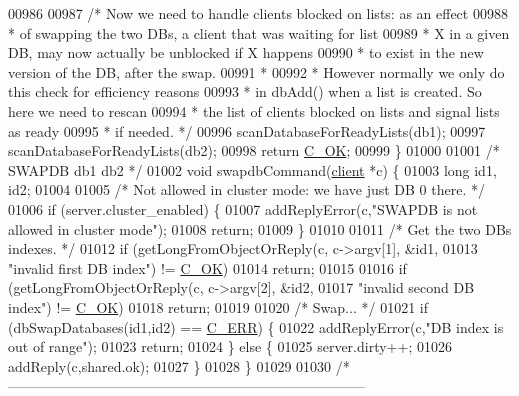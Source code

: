 \begin{DoxyCode}
00986 
00987     \textcolor{comment}{/* Now we need to handle clients blocked on lists: as an effect}
00988 \textcolor{comment}{     * of swapping the two DBs, a client that was waiting for list}
00989 \textcolor{comment}{     * X in a given DB, may now actually be unblocked if X happens}
00990 \textcolor{comment}{     * to exist in the new version of the DB, after the swap.}
00991 \textcolor{comment}{     *}
00992 \textcolor{comment}{     * However normally we only do this check for efficiency reasons}
00993 \textcolor{comment}{     * in dbAdd() when a list is created. So here we need to rescan}
00994 \textcolor{comment}{     * the list of clients blocked on lists and signal lists as ready}
00995 \textcolor{comment}{     * if needed. */}
00996     scanDatabaseForReadyLists(db1);
00997     scanDatabaseForReadyLists(db2);
00998     \textcolor{keywordflow}{return} \hyperlink{server_8h_a303769ef1065076e68731584e758d3e1}{C\_OK};
00999 \}
01000 
01001 \textcolor{comment}{/* SWAPDB db1 db2 */}
01002 \textcolor{keywordtype}{void} swapdbCommand(\hyperlink{structclient}{client} *c) \{
01003     \textcolor{keywordtype}{long} id1, id2;
01004 
01005     \textcolor{comment}{/* Not allowed in cluster mode: we have just DB 0 there. */}
01006     \textcolor{keywordflow}{if} (server.cluster\_enabled) \{
01007         addReplyError(c,\textcolor{stringliteral}{"SWAPDB is not allowed in cluster mode"});
01008         \textcolor{keywordflow}{return};
01009     \}
01010 
01011     \textcolor{comment}{/* Get the two DBs indexes. */}
01012     \textcolor{keywordflow}{if} (getLongFromObjectOrReply(c, c->argv[1], &id1,
01013         \textcolor{stringliteral}{"invalid first DB index"}) != \hyperlink{server_8h_a303769ef1065076e68731584e758d3e1}{C\_OK})
01014         \textcolor{keywordflow}{return};
01015 
01016     \textcolor{keywordflow}{if} (getLongFromObjectOrReply(c, c->argv[2], &id2,
01017         \textcolor{stringliteral}{"invalid second DB index"}) != \hyperlink{server_8h_a303769ef1065076e68731584e758d3e1}{C\_OK})
01018         \textcolor{keywordflow}{return};
01019 
01020     \textcolor{comment}{/* Swap... */}
01021     \textcolor{keywordflow}{if} (dbSwapDatabases(id1,id2) == \hyperlink{server_8h_af98ac28d5f4d23d7ed5985188e6fb7d1}{C\_ERR}) \{
01022         addReplyError(c,\textcolor{stringliteral}{"DB index is out of range"});
01023         \textcolor{keywordflow}{return};
01024     \} \textcolor{keywordflow}{else} \{
01025         server.dirty++;
01026         addReply(c,shared.ok);
01027     \}
01028 \}
01029 
01030 \textcolor{comment}{/*-----------------------------------------------------------------------------}

\end{DoxyCode}
